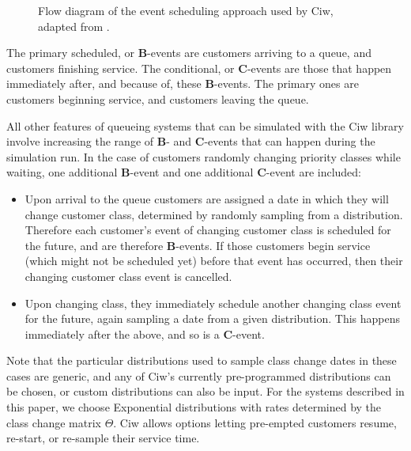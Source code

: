 \documentclass{article}
\begin{document}
\begin{figure}
    \centering
    
    \caption{Flow diagram of the event scheduling approach used by Ciw, adapted
    from \cite{palmer18}.}
    \label{fig:eventscheduling}
\end{figure}

The primary scheduled, or \textbf{B}-events are customers arriving to a queue,
and customers finishing service. The conditional, or \textbf{C}-events are those
that happen immediately after, and because of, these \textbf{B}-events. The
primary ones are customers beginning service, and customers leaving the queue.

All other features of queueing systems that can be simulated with the Ciw
library involve increasing the range of \textbf{B}- and \textbf{C}-events that
can happen during the simulation run.
In the case of customers randomly changing priority classes while waiting, one
additional \textbf{B}-event and one additional \textbf{C}-event are included:

\begin{itemize}
  \item Upon arrival to the queue customers are assigned a date in which they
  will change customer class, determined by randomly sampling from a
  distribution. Therefore each customer's event of changing customer class is
  scheduled for the future, and are therefore \textbf{B}-events. If those
  customers begin service (which might not be scheduled yet) before that event
  has occurred, then their changing customer class event is cancelled.
  \item Upon changing class, they immediately schedule another changing class
  event for the future, again sampling a date from a given distribution. This
  happens immediately after the above, and so is a \textbf{C}-event.
\end{itemize}

Note that the particular distributions used to sample class change dates in
these cases are generic, and any of Ciw's currently pre-programmed distributions
can be chosen, or custom distributions can also be input. For the systems
described in this paper, we choose Exponential distributions with rates
determined by the class change matrix $\Theta$. Ciw allows options letting
pre-empted customers resume, re-start, or re-sample their service time.
\end{document}
